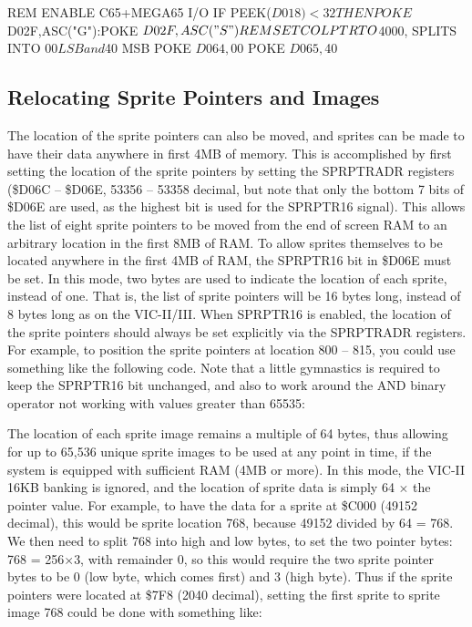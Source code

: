 \begin{screenoutput}
REM ENABLE C65+MEGA65 I/O
IF PEEK($D018)<32 THEN POKE $D02F,ASC("G"):POKE $D02F,ASC("S")
REM SET COLPTR TO $4000, SPLITS INTO $00 LSB and $40 MSB
POKE $D064,$00
POKE $D065,$40
\end{screenoutput}

\subsection{Relocating Sprite Pointers and Images}

The location of the sprite pointers can also be moved, and sprites can be made to have their data anywhere in first 4MB of memory.
This is accomplished by first setting the location of the sprite pointers by setting the SPRPTRADR registers (\$D06C -- \$D06E, 53356 -- 53358 decimal, but note that only the bottom 7 bits of \$D06E are used, as the highest bit is used for the SPRPTR16 signal).  This allows the list of
eight sprite pointers to be moved from the end of screen RAM to an arbitrary location in the first 8MB of RAM.  To allow sprites themselves
to be located anywhere in the first 4MB of RAM, the SPRPTR16 bit in \$D06E must be set. In this mode, two bytes are used to indicate the
location of each sprite, instead of one. That is, the list of sprite pointers will be 16 bytes long, instead of 8 bytes long as on the VIC-II/III.  When SPRPTR16 is enabled, the location of the sprite pointers should always be set explicitly via the SPRPTRADR registers.
For example, to position the sprite pointers at location 800 -- 815, you could use something like the following code. Note that a little gymnastics is required to keep the SPRPTR16 bit unchanged, and also to work around the AND binary operator not working with values greater than 65535:


The location of each sprite image remains a multiple of 64 bytes, thus allowing for up to 65,536 unique sprite images
to be used at any point in time, if the system is equipped with sufficient RAM (4MB or more).  In this mode, the VIC-II 16KB banking is ignored, and the location of sprite data is simply 64 $\times$ the pointer value.  For example, to have the data for a sprite at \$C000 (49152 decimal), this would be sprite location 768, because 49152 divided by 64 = 768.  We then need to split 768 into high and low bytes, to set the two pointer bytes: 768 = 256$\times$3, with remainder 0, so this would require the two sprite pointer bytes to be 0 (low byte, which comes first) and 3 (high byte).  Thus if the sprite pointers were located at \$7F8 (2040 decimal), setting the first sprite to sprite image 768 could be done with something like:

